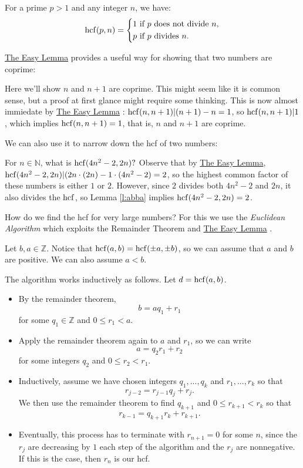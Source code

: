 \documentclass[11pt,dvipsnames]{book}
\def\hcf{{\rm hcf}}
\numberwithin{equation}{section} %
\numberwithin{figure}{section} %
\numberwithin{table}{section} %
\begin{document}
For a prime $p>1$ and any integer $n$, we have:
$$
\mathrm{hcf}(p,n) = \left\{\aligned%
&1\ \text{if $p$ does not divide $n$},\\
&p\ \text{if $p$  divides $n$}.\\
\endaligned
\right.
$$

\hyperref[l:easy-lemma]{The Easy Lemma}  provides a useful way for showing that two numbers are coprime:

\begin{example}
Here we'll show $n$ and $n+1$ are coprime. This might seem like it is common sense, but a proof at first glance might require some thinking. This is now almost immiedate by \hyperref[l:easy-lemma]{The Easy Lemma} : $\hcf(n,n+1)|(n+1)-n=1$, so $\hcf(n,n+1)|1$, which implies $\hcf(n,n+1)=1$, that is, $n$ and $n+1$ are coprime. 
\end{example}

We can also use it to narrow down the hcf of two numbers:

\begin{example}
For $n\in\mathbb{N}$, what is $\hcf(4n^2-2,2n)?$ Observe that by \hyperref[l:easy-lemma]{The Easy Lemma}, $\hcf(4n^2-2,2n)|(2n\cdot (2n)-1\cdot (4n^2-2)=2$, so the highest common factor of these numbers is either $1$ or $2$. However, since $2$ divides both $4n^2-2$ and $2n$, it also divides the $\hcf$, so Lemma \ref{l:abba} implies $\hcf(4n^2-2,2n)=2$.
\end{example}



How do we find the hcf for very large numbers? For this we use the {\it Euclidean Algorithm} which exploits the  Remainder Theorem and \hyperref[l:easy-lemma]{The Easy Lemma} . 

Let $b,a\in\mathbb{Z}$. Notice that $\hcf(a,b)=\hcf(\pm a,\pm b)$, so we can assume that $a$ and $b$ are positive. We can also assume $a<b$. 

The algorithm works inductively as follows. Let $d=\hcf(a,b)$.

\begin{itemize}
\item By the remainder theorem, $$b=aq_{1}+r_{1}$$ for some $q_{1}\in\mathbb{Z}$ and $0\leq r_{1}<a$. 
\item Apply the remainder theorem again to $a$ and $r_{1}$, so we can write $$a=q_{2}r_{1}+r_{2}$$ for some integers $q_{2}$ and $0\leq r_{2}<r_{1}$. 
\item Inductively, assume we have chosen integers $q_{1},...,q_{k}$ and $r_{1},...,r_{k}$ so that 
\[
r_{j-2}=r_{j-1}q_{j}+r_{j}.\] 
We then use the remainder theorem to find $q_{k+1}$ and $0\leq r_{k+1}<r_{k}$ so that $$r_{k-1}=q_{k+1}r_{k}+r_{k+1}.$$ 
\item Eventually, this process has to terminate with $r_{n+1}=0$ for some $n$, since the $r_{j}$ are decreasing by $1$ each step of the algorithm and the $r_{j}$ are nonnegative. If this is the case, then $r_{n}$ is our hcf. 
\end{itemize}
\end{document}
